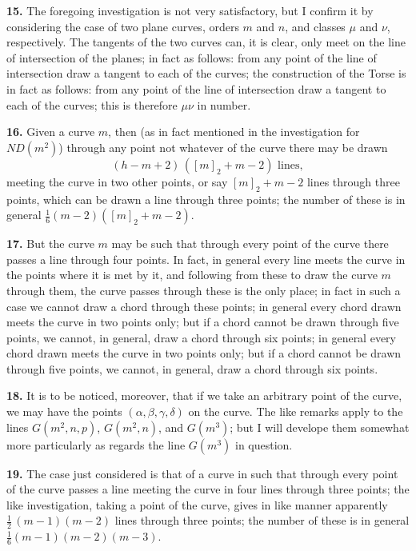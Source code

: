 \documentclass[11pt,a4paper]{article}
\begin{document}
\medskip

\textbf{15.} The foregoing investigation is not very satisfactory, but I confirm it by considering the case of two plane curves, orders $m$ and $n$, and classes $\mu$ and $\nu$, respectively. The tangents of the two curves can, it is clear, only meet on the line of intersection of the planes; in fact as follows: from any point of the line of intersection draw a tangent to each of the curves; the construction of the Torse is in fact as follows: from any point of the line of intersection draw a tangent to each of the curves; this is therefore $\mu\nu$ in number.

\medskip

\textbf{16.} Given a curve $m$, then (as in fact mentioned in the investigation for $ND(m^2)$) through any point not whatever of the curve there may be drawn
\[
(h - m + 2)\,([m]_2 + m - 2)\text{ lines},
\]
meeting the curve in two other points, or say $[m]_2 + m - 2$ lines through three points, which can be drawn a line through three points; the number of these is in general $\frac{1}{6}(m-2)([m]_2 + m - 2)$.

\medskip

\textbf{17.} But the curve $m$ may be such that through every point of the curve there passes a line through four points. In fact, in general every line meets the curve in the points where it is met by it, and following from these to draw the curve $m$ through them, the curve passes through these is the only place; in fact in such a case we cannot draw a chord through these points; in general every chord drawn meets the curve in two points only; but if a chord cannot be drawn through five points, we cannot, in general, draw a chord through six points; in general every chord drawn meets the curve in two points only; but if a chord cannot be drawn through five points, we cannot, in general, draw a chord through six points.

\medskip

\textbf{18.} It is to be noticed, moreover, that if we take an arbitrary point of the curve, we may have the points $(\alpha, \beta, \gamma, \delta)$ on the curve. The like remarks apply to the lines $G(m^2, n, p)$, $G(m^2, n)$, and $G(m^3)$; but I will develope them somewhat more particularly as regards the line $G(m^3)$ in question.

\medskip

\textbf{19.} The case just considered is that of a curve in such that through every point of the curve passes a line meeting the curve in four lines through three points; the like investigation, taking a point of the curve, gives in like manner apparently $\frac{1}{2}\,(m-1)(m-2)$ lines through three points; the number of these is in general $\frac{1}{6}(m-1)(m-2)(m-3)$.
\end{document}
